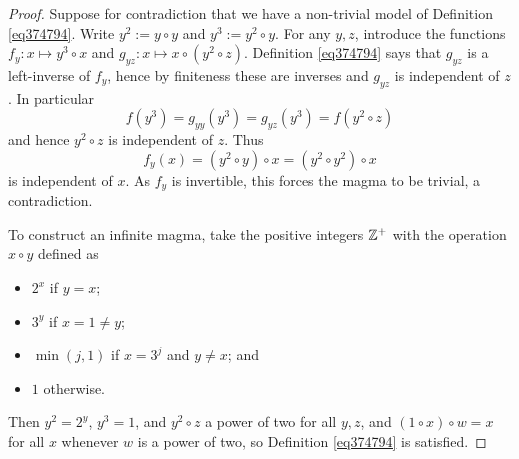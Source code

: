 \begin{proof} \leanok Suppose for contradiction that we have a non-trivial model of Definition \ref{eq374794}. Write $y^2 := y \circ y$ and $y^3 := y^2 \circ y$. For any $y,z$, introduce the functions $f_y: x \mapsto y^3 \circ x$ and $g_{yz}: x \mapsto x \circ (y^2 \circ z)$.  Definition \ref{eq374794} says that $g_{yz}$ is a left-inverse of $f_y$, hence by finiteness these are inverses and $g_{yz}$ is independent of $z$. In particular
$$ f(y^3) = g_{yy}(y^3) = g_{yz}(y^3) = f(y^2 \circ z)$$
and hence $y^2 \circ z$ is independent of $z$.  Thus
$$ f_y(x) = (y^2 \circ y) \circ x = (y^2 \circ y^2) \circ x$$
is independent of $x$.  As $f_y$ is invertible, this forces the magma to be trivial, a contradiction.

To construct an infinite magma, take the positive integers $\mathbb{Z}^+$ with the operation $x \circ y$ defined as
\begin{itemize}
  \item $2^x$ if $y=x$;
  \item $3^y$ if $x = 1 \neq y$;
  \item $\min(j,1)$ if $x=3^j$ and $y \neq x$; and
  \item $1$ otherwise.
\end{itemize}
Then $y^2 = 2^y$, $y^3 = 1$, and $y^2 \circ z$ a power of two for all $y, z$, and $(1 \circ x) \circ w = x$ for all $x$ whenever $w$ is a power of two, so Definition \ref{eq374794} is satisfied.
\end{proof}
